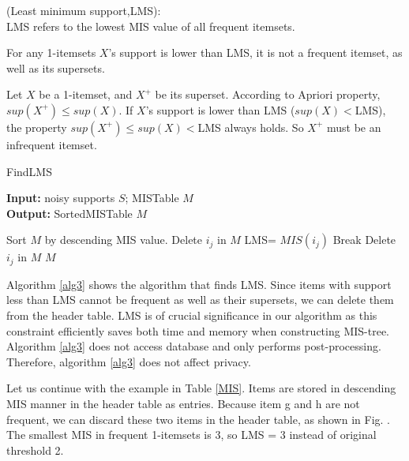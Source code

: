 \documentclass[conference]{IEEEtran}
\begin{document}
\begin{definition}{(Least minimum support,LMS):}\\
LMS refers to the lowest MIS value of all frequent itemsets.
\end{definition}
\begin{theorem}
For any 1-itemsets $X$'s support is lower than LMS, it is not a frequent itemset, as well as its supersets.
\label{th3}
\end{theorem}
\begin{IEEEproof}
Let $X$ be a 1-itemset, and $X^+$ be its superset.
According to Apriori property, $sup(X^+)\leq sup(X)$. 
If $X$'s support is lower than LMS ($sup(X)<$LMS), 
the property  $sup(X^+)\leq sup(X)<$LMS always holds. 
So $X^+$ must be an infrequent itemset.
\end{IEEEproof}

\begin{algorithm}[htbp]
    \caption{FindLMS}
    \hspace*{0.02in} {\bf Input:} %
    noisy supports $S$; MISTable $M$\\
    \hspace*{0.02in} {\bf Output:} %
    SortedMISTable $M$

    \begin{algorithmic}[1]
        \State Sort $M$ by descending MIS value.
        \State Delete $i_j$ in $M$
        \Else
        \State LMS= $MIS(i_j)$
        \State Break
        \EndIf
        \EndFor
        \State Delete $i_j$ in $M$
        \EndIf    
        \EndFor
        \State \Return $M$

    \end{algorithmic} 
    \label{alg3}
\end{algorithm}
Algorithm \ref{alg3} shows the algorithm that finds LMS.
Since items with support less than LMS cannot be frequent as well as their supersets, we can delete them from the header table.
LMS is of crucial significance in our algorithm as this constraint efficiently saves both time and memory when constructing MIS-tree.
Algorithm \ref{alg3} does not access database and only performs post-processing. Therefore, algorithm \ref{alg3} does not affect privacy.

\begin{example}
    Let us continue with the example in Table \ref{MIS}.
    Items are stored in descending MIS manner in the header table as entries. 
    Because item g and h are not frequent, we can discard these two items in the header table, as shown in Fig. . 
    The smallest MIS in frequent 1-itemsets is 3, so LMS = 3 instead of original threshold 2. 
\end{example}
\end{document}
